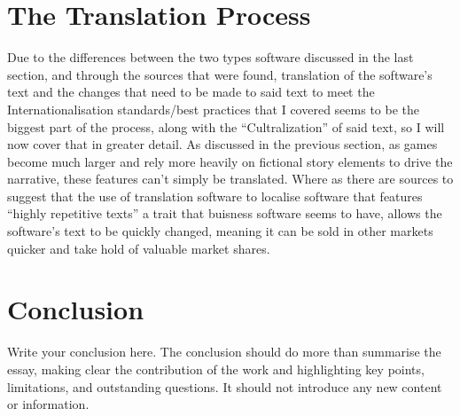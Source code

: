 \documentclass{scrartcl}
\begin{document}
\section{The Translation Process}
Due to the differences between the two types software discussed in the last section, and through the sources that were found, translation of the software's text and the changes that need to be made to said text to meet the Internationalisation standards/best practices that I covered seems to be the biggest part of the process, along with the ``Cultralization'' of said text, so I will now cover that in greater detail. As discussed in the previous section, as games become much larger and rely more heavily on fictional story elements to drive the narrative, these features can't simply be translated. Where as there are sources to suggest that the use of translation software to localise software that features ``highly repetitive texts'' \cite[pg.1]{schaler1994practical} a trait that buisness software seems to have, allows the software's text to be quickly changed, meaning it can be sold in other markets quicker and take hold of valuable market shares.




\section{Conclusion}

Write your conclusion here. The conclusion should do more than summarise the essay, making clear the contribution of the work and highlighting key points, limitations, and outstanding questions. It should not introduce any new content or information.



\end{document}
